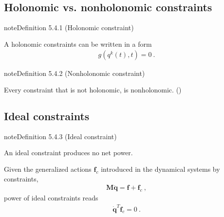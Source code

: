 \documentclass[letterpaper,10pt,english]{jupyterBook}
\begin{document}
\subsection{Holonomic vs. non\sphinxhyphen{}holonomic constraints}
\label{\detokenize{ch/lagrange-constraints:holonomic-vs-non-holonomic-constraints}}\label{ch/lagrange-constraints:holonomic-constraint}
\begin{sphinxadmonition}{note}{Definition 5.4.1 (Holonomic constraint)}



\sphinxAtStartPar
A holonomic constraints can be written in a form
\begin{equation*}
\begin{split}g(q^k(t), t) = 0 \ .\end{split}
\end{equation*}\end{sphinxadmonition}
\label{ch/lagrange-constraints:non-holonomic-constraint}
\begin{sphinxadmonition}{note}{Definition 5.4.2 (Non\sphinxhyphen{}holonomic constraint)}



\sphinxAtStartPar
Every constraint that is not holonomic, is non\sphinxhyphen{}holonomic. ()
\end{sphinxadmonition}

\sphinxAtStartPar
{} 


\subsection{Ideal constraints}
\label{\detokenize{ch/lagrange-constraints:classical-mechanics-lagrange-constraints-ideal}}\label{\detokenize{ch/lagrange-constraints:ideal-constraints}}\label{ch/lagrange-constraints:definition-2}
\begin{sphinxadmonition}{note}{Definition 5.4.3 (Ideal constraint)}



\sphinxAtStartPar
An ideal constraint produces no net power.
\end{sphinxadmonition}

\sphinxAtStartPar
Given the generalized actions \(\mathbf{f}_c\) introduced in the dynamical systems by constraints,
\begin{equation*}
\begin{split}\mathbf{M} \ddot{\mathbf{q}} = \mathbf{f} + \mathbf{f}_c \ ,\end{split}
\end{equation*}
\sphinxAtStartPar
power of ideal constraints reads
\begin{equation*}
\begin{split}\dot{\mathbf{q}}^T \mathbf{f}_c = 0 \ .\end{split}
\end{equation*}
\end{document}
